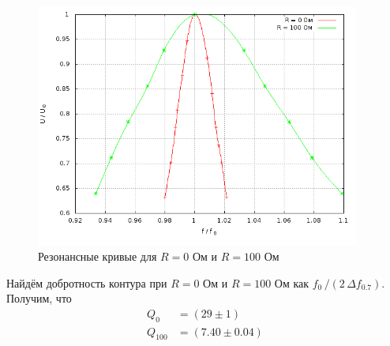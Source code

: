 \documentclass[12pt]{article}
\begin{document}
	\begin{figure}[h!]
		\centering
		\includegraphics[height = 8cm, width = 14 cm]{plot1.png}
		\caption{Резонансные кривые для $R = 0$ Ом и $R = 100$ Ом}
	\end{figure}	
	\par
		Найдём добротность контура при $R = 0$ Ом и $R = 100$ Ом как $f_0 \, / \left(2 \, \Delta f_\text{$0.7$} \right)$. Получим, что
		\begin{align*}
			Q_0 &= \left(29 \pm 1 \right) \\
			Q_\text{$100$} &= \left(7.40 \pm 0.04 \right)
		\end{align*}
	\newpage
\end{document}

